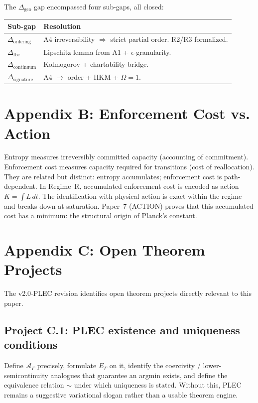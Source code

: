 \documentclass[11pt]{article}
\begin{document}
The $\Delta_{\mathrm{geo}}$ gap encompassed four sub-gaps, all closed:

\begin{center}
\begin{tabular}{@{}ll@{}}
\toprule
Sub-gap & Resolution \\
\midrule
$\Delta_{\mathrm{ordering}}$ & A4 irreversibility $\Rightarrow$ strict partial order. R2/R3 formalized. \\
$\Delta_{\mathrm{fbc}}$ & Lipschitz lemma from A1 + $\epsilon$-granularity. \\
$\Delta_{\mathrm{continuum}}$ & Kolmogorov + chartability bridge. \\
$\Delta_{\mathrm{signature}}$ & A4 $\to$ order + HKM + $\Omega = 1$. \\
\bottomrule
\end{tabular}
\end{center}

\section*{Appendix B: Enforcement Cost vs. Action}

Entropy measures irreversibly committed capacity (accounting of commitment).
Enforcement cost measures capacity required for transitions (cost of
reallocation). They are related but distinct: entropy accumulates; enforcement
cost is path-dependent. In Regime~R, accumulated enforcement cost is encoded as
action $K = \int L\,dt$. The identification with physical action is exact within
the regime and breaks down at saturation. Paper~7 (ACTION) proves that this
accumulated cost has a minimum: the structural origin of Planck's constant.

\section*{Appendix C: Open Theorem Projects}

The v2.0-PLEC revision identifies open theorem projects directly relevant to
this paper.

\subsection*{Project C.1: PLEC existence and uniqueness conditions}
Define $\mathcal{A}_{\Gamma}$ precisely, formulate $E_{\Gamma}$ on it, identify
the coercivity / lower-semicontinuity analogues that guarantee an argmin
exists, and define the equivalence relation $\sim$ under which uniqueness is
stated. Without this, PLEC remains a suggestive variational slogan rather than
a usable theorem engine.
\end{document}

